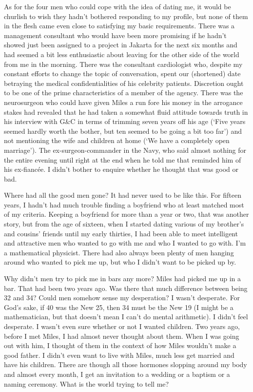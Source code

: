 As for the four men who could cope with the idea of dating me, it
would be churlish to wish they hadn't bothered responding to my
profile, but none of them in the flesh came even close to satisfying
my basic requirements. There was a management consultant who would
have been more promising if he hadn't showed just been assigned to a
project in Jakarta for the next six months and had seemed a bit less
enthusiastic about leaving for the other side of the world from me
in the morning. There was the consultant cardiologist who, despite
my constant efforts to change the topic of conversation, spent our
(shortened) date betraying the medical confidentialities of his
celebrity patients. Discretion ought to be one of the prime
characteristics of a member of the agency. There was the
neurosurgeon who could have given Miles a run fore his money in the
arrogance stakes had revealed that he had taken a somewhat fluid
attitude towards truth in his interview with G{\&}C in terms of
trimming seven years off his age (`Five years seemed hardly worth
the bother, but ten seemed to be going a bit too far') and not
mentioning the wife and children at home (`We have a completely open
marriage'). The ex-surgeon-commander in the Navy, who said almost
nothing for the entire evening until right at the end when he told
me that reminded him of his ex-fiancée. I didn't bother to
enquire whether he thought that was good or bad.

Where had all the good men gone? It had never used to be like this.
For fifteen years, I hadn't had much trouble finding a boyfriend who
at least matched most of my criteria. Keeping a boyfriend for more
than a year or two, that was another story, but from the age of
sixteen, when I started dating various of my brother's and cousins'
friends until my early thirties, I had been able to meet intelligent
and attractive men who wanted to go with me and who I wanted to go
with. I'm a mathematical physicist. There had also always been plenty of
men hanging around who wanted to pick me up, but who I didn't want
to be picked up by.

Why didn't men try to pick me in bars any more? Miles had picked me
up in a bar. That had been two years ago. Was there that much
difference between being 32 and 34? Could men somehow sense my
desperation? I wasn't desperate. For God's sake, if 40 was the New
25, then 34 must be the New 19 (I might be a mathematician, but that
doesn't mean I can't do mental arithmetic). I didn't feel desperate.
I wasn't even sure whether or not I wanted children. Two years ago,
before I met Miles, I had almost never thought about them. When I was going out
with him, I thought of them in the context of how Miles wouldn't
make a good father. I didn't even want to live with Miles, much less
get married and have his children. There are though all those hormones
slopping around my body and almost every month, I get an invitation to a
wedding or a baptism or a naming ceremony. What is the world trying
to tell me?

